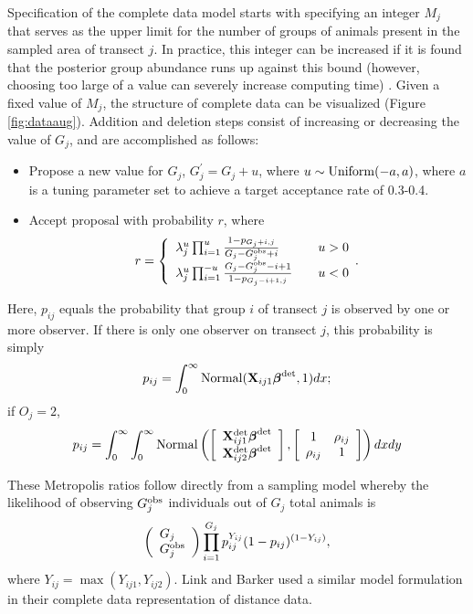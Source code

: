 \documentclass[10pt]{article}
\begin{document}
Specification of the complete data model starts with specifying an integer $M_j$ that serves as the upper limit for the number of groups of animals present in the sampled area of transect $j$. In practice, this integer can be increased if it is found that the posterior group abundance runs up against this bound (however, choosing too large of a value can severely increase computing time) \cite{DurbanEston2005}.
Given a fixed value of $M_j$, the structure of complete data can be visualized (Figure \ref{fig:dataaug}).
Addition and deletion steps consist of increasing or decreasing the value of $G_j$, and are accomplished as follows:
\begin{itemize}
    \item Propose a new value for $G_j$, $G_j^\prime=G_j+u$, where
    $u\sim {\rm Uniform}(-a,a)$, where $a$ is a tuning parameter set to achieve a target acceptance rate of 0.3-0.4.
    \item Accept proposal with probability $r$, where
    $$
    r= \left\{ \begin{array}{lll}
				\lambda_j^u \prod_{i=1}^u
                \frac{1-p_{G_j+i,j}}{G_j-G_j^{\rm obs}+i}& & u>0\\
			    \lambda_j^u \prod_{i=1}^{-u}
                \frac{G_j-G_j^{\rm obs}-i+1}{
                1-p_{G_j-i+1,j}}& & u<0
		\end{array}. \right.
    $$
\end{itemize}
    Here, $p_{ij}$ equals the probability that group $i$ of transect $j$ is observed by one or more observer.  If there is only one observer on transect $j$, this probability is simply $$
      p_{ij} = \int_0^\infty {\rm Normal}({\bf X}_{ij1}\boldsymbol{\beta}^{\rm det},1)dx;
    $$
    if $O_j=2$,
    $$
      p_{ij} = \int_0^\infty \int_0^\infty {\rm Normal}
        \left( \left[ \begin{array}{c}
				{\bf X}_{ij1}^{\rm det} \boldsymbol{\beta}^{\rm
                det}\\
				{\bf X}_{ij2}^{\rm det} \boldsymbol{\beta}^{\rm
                det}
		\end{array}\right],
        \left[ \begin{array}{cc}
            1 & \rho_{ij} \\
            \rho_{ij} & 1
        \end{array} \right]
        \right) dx dy
    $$


These Metropolis ratios follow directly from a sampling model whereby the likelihood of observing $G_j^{\rm obs}$ individuals out of $G_j$ total animals is
$$
\left( \begin{array}{l}
G_j \\
G_j^{\rm obs}
\end{array} \right)
\prod_{i=1}^{G_j} p_{ij}^{Y_{ij}} (1-p_{ij})^{(1-Y_{ij})},
$$
where $Y_{ij}=\max(Y_{ij1},Y_{ij2})$.  Link and Barker \cite{LinkBarker2010} used a similar model formulation in their complete data representation of distance data.
\end{document}
